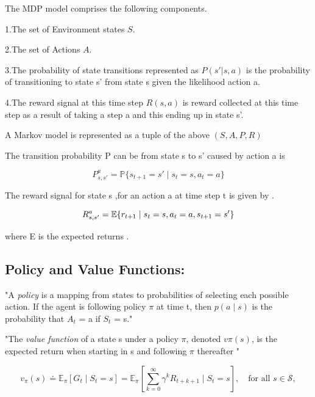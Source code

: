 \documentclass[a4paper,12pt]{Classes/RoboticsLaTeX}
\begin{document}
     The MDP model comprises the following components.
     
     1.The set of Environment states $S$.
     
     2.The set of Actions $A$.
     
     3.The probability of state transitions represented as $P(s'|s,a)$ is the  probability of transitioning to state s' from state s given the likelihood action a.
     
     4.The reward signal at this time step $R(s,a)$ is reward collected at this time step as a result of taking a step a and this ending up in state s'.

     \noindent A Markov model is represented as a tuple of the above  $(S,A,P,R)$

     \noindent The transition probability P can be from state s to s' caused by action a  is 

     \begin{equation}
     P_{s,s'}^a = \mathbb{P}\{s_{t+1} = s' \mid s_t = s, a_t = a\}
    \end{equation}
     
     The reward signal for state s ,for an  action a at time step t is given by . 
     
     \begin{equation}
      R_{s,s'}^a = \mathbb{E}\{r_{t+1} \mid s_t = s, \\
     a_t = a, s_{t+1} = s'\}
     \end{equation}

     where E is the expected returns .

     \subsection{Policy and Value Functions:}
     
    "A \textit{policy} is a mapping from states to probabilities of selecting each possible
     action. If the agent is following policy $\pi$ at time t, then $p(a \mid s)$ is the probability that
     $A_t$ = a if $S_t$ = s." \cite{Sutton_Barto_2020}

    "The \textit{value function} of a state s under a policy $\pi$, denoted $v\pi(s)$, is the expected return
    when starting in s and following $\pi$ thereafter " \cite{Sutton_Barto_2020}

    \begin{equation}
    v_{\pi}(s) \doteq \mathbb{E}_{\pi} [G_t \mid S_t = s] = \mathbb{E}_{\pi} \left[\sum_{k=0}^{\infty} \gamma^k R_{t+k+1} \mid S_t = s \right], \quad \text{for all } s \in \mathcal{S},
    \end{equation}
\end{document}
